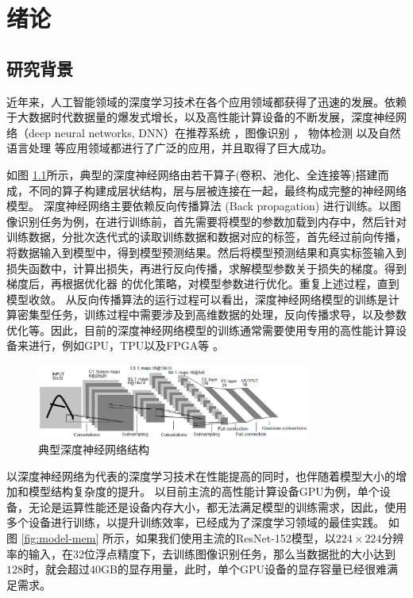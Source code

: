 
\chapter{绪论}\label{chapter_introduction}
\section{研究背景}

近年来，人工智能领域的深度学习技术在各个应用领域都获得了迅速的发展。依赖于大数据时代数据量的爆发式增长，以及高性能计算设备的不断发展，深度神经网络（deep neural networks, DNN）在推荐系统 ，图像识别 ， 物体检测 以及自然语言处理  等应用领域都进行了广泛的应用，并且取得了巨大成功。

如图 \ref{fig:dnn-arch}所示，典型的深度神经网络由若干算子(卷积、池化、全连接等)搭建而成，不同的算子构建成层状结构，层与层被连接在一起，最终构成完整的神经网络模型。
深度神经网络主要依赖反向传播算法 (Back propagation) 进行训练。以图像识别任务为例，在进行训练前，首先需要将模型的参数加载到内存中，然后针对训练数据，分批次迭代式的读取训练数据和数据对应的标签，首先经过前向传播，将数据输入到模型中，得到模型预测结果。然后将模型预测结果和真实标签输入到损失函数中，计算出损失，再进行反向传播，求解模型参数关于损失的梯度。得到梯度后，再根据优化器 的优化策略，对模型参数进行优化。重复上述过程，直到模型收敛。
从反向传播算法的运行过程可以看出，深度神经网络模型的训练是计算密集型任务，训练过程中需要涉及到高维数据的处理，反向传播求导，以及参数优化等。因此，目前的深度神经网络模型的训练通常需要使用专用的高性能计算设备来进行，例如GPU，TPU以及FPGA等 。
\begin{figure}[h]
	\centering
	\includegraphics[width=0.8\textwidth]{figure/1-intro/dnn.png}
	\caption{典型深度神经网络结构}
	\label{fig:dnn-arch}
\end{figure}

以深度神经网络为代表的深度学习技术在性能提高的同时，也伴随着模型大小的增加和模型结构复杂度的提升。
以目前主流的高性能计算设备GPU为例，单个设备，无论是运算性能还是设备内存大小，都无法满足模型的训练需求，因此，使用多个设备进行训练，以提升训练效率，已经成为了深度学习领域的最佳实践。
如图 \ref{fig:model-mem} 所示，如果我们使用主流的ResNet-152模型，以$224\times 224$分辨率的输入，在32位浮点精度下，去训练图像识别任务，那么当数据批的大小达到$128$时，就会超过40GB的显存用量，此时，单个GPU设备的显存容量已经很难满足需求。

